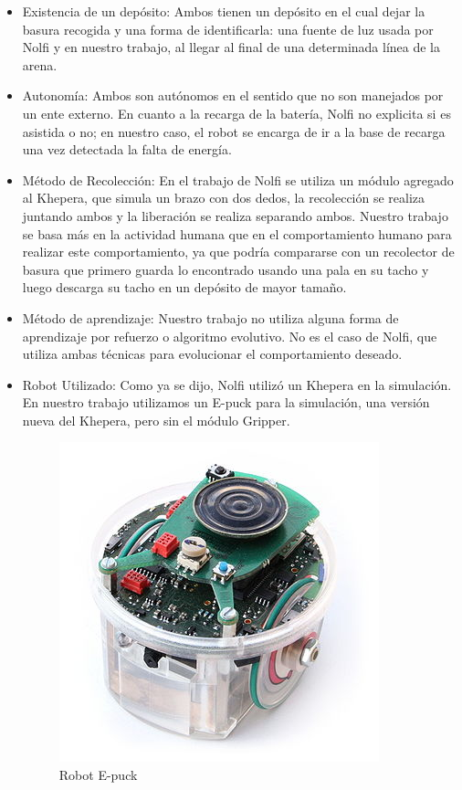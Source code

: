 \begin{itemize}

\item{Existencia de un dep\'osito:} Ambos tienen un dep\'osito en el cual dejar la basura recogida y una forma
de identificarla: una fuente de luz usada por Nolfi y en nuestro trabajo, al llegar al final de una determinada
l\'inea de la arena.

\item{Autonom\'ia:} Ambos son aut\'onomos en el sentido que no son manejados por un ente externo. En cuanto
a la recarga de la bater\'ia, Nolfi no explicita si es asistida o no; en nuestro caso, el robot se encarga
de ir a la base de recarga una vez detectada la falta de energ\'ia.

\item{M\'etodo de Recolecci\'on:} En el trabajo de Nolfi se utiliza un m\'odulo agregado al Khepera, que simula
un brazo con dos dedos, la recolecci\'on se realiza juntando ambos y la liberaci\'on se realiza separando ambos.
Nuestro trabajo se basa m\'as en la actividad humana que en el comportamiento humano para realizar este comportamiento,
ya que podr\'ia compararse con un recolector de basura que primero guarda lo encontrado usando una pala en su tacho
y luego descarga su tacho en un dep\'osito de mayor tama\~no.

\item{M\'etodo de aprendizaje:} Nuestro trabajo no utiliza alguna forma de aprendizaje por refuerzo o algoritmo
evolutivo. No es el caso de Nolfi, que utiliza ambas t\'ecnicas para evolucionar el comportamiento deseado.

\item{Robot Utilizado:} Como ya se dijo, Nolfi utiliz\'o un Khepera en la simulaci\'on. En nuestro trabajo
utilizamos un E-puck para la simulaci\'on, una versi\'on nueva del Khepera, pero sin el m\'odulo Gripper.
\begin{figure}[htp]
\begin{center}
\includegraphics[scale=0.6]{comportamientos/e-puck.png}
\caption{Robot E-puck}
\label{fig:epuck}
\end{center}
\end{figure}

\end{itemize}

